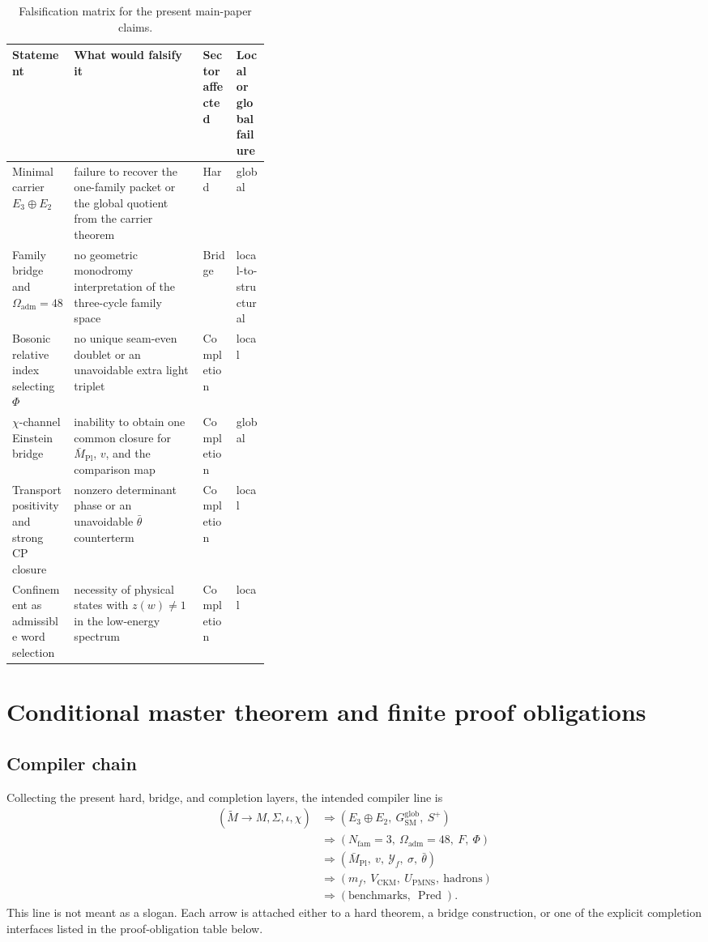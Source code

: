\documentclass[11pt,a4paper]{article}
\theoremstyle{definition}
\theoremstyle{remark}
\newcommand{\Seam}{\Sigma}
\newcommand{\inv}{\iota}
\newcommand{\Mpl}{\bar M_{\mathrm{Pl}}}
\newcommand{\SM}{\mathrm{SM}}
\newcommand{\Oadm}{\Omega_{\mathrm{adm}}}
\newcommand{\Pred}{\operatorname{Pred}}
\begin{document}
\begin{table}[t]
\centering
\small
\begin{tabularx}{\linewidth}{@{}>{\raggedright\arraybackslash}p{0.24\linewidth}YY>{\raggedright\arraybackslash}p{0.13\linewidth}@{}}
\toprule
Statement & What would falsify it & Sector affected & Local or global failure \\
\midrule
Minimal carrier $E_3\oplus E_2$ & failure to recover the one-family packet or the global quotient from the carrier theorem & Hard & global \\
Family bridge and $\Oadm=48$ & no geometric monodromy interpretation of the three-cycle family space & Bridge & local-to-structural \\
Bosonic relative index selecting $\Phi$ & no unique seam-even doublet or an unavoidable extra light triplet & Completion & local \\
$\chi$-channel Einstein bridge & inability to obtain one common closure for $\Mpl$, $v$, and the comparison map & Completion & global \\
Transport positivity and strong CP closure & nonzero determinant phase or an unavoidable $\bar\theta$ counterterm & Completion & local \\
Confinement as admissible word selection & necessity of physical states with $z(w)\neq1$ in the low-energy spectrum & Completion & local \\
\bottomrule
\end{tabularx}
\caption{Falsification matrix for the present main-paper claims.}
\label{tab:falsification}
\end{table}

\section{Conditional master theorem and finite proof obligations}

\subsection{Compiler chain}

Collecting the present hard, bridge, and completion layers, the intended compiler line is
\begin{equation}
\label{eq:conditional-compiler-chain}
\begin{aligned}
(\widetilde M\to M,\Seam,\inv,\chi)
&\Rightarrow
(E_3\oplus E_2,\ G_{\SM}^{\mathrm{glob}},\ S^+)\\
&\Rightarrow
(N_{\mathrm{fam}}=3,\ \Oadm=48,\ F,\ \Phi)\\
&\Rightarrow
(\Mpl,\ v,\ \mathcal Y_f,\ \sigma,\ \bar\theta)\\
&\Rightarrow
(m_f,\ V_{\mathrm{CKM}},\ U_{\mathrm{PMNS}},\ \text{hadrons})\\
&\Rightarrow
(\text{benchmarks},\ \Pred).
\end{aligned}
\end{equation}
This line is not meant as a slogan. Each arrow is attached either to a hard theorem, a bridge construction, or one of the explicit completion interfaces listed in the proof-obligation table below.
\end{document}

